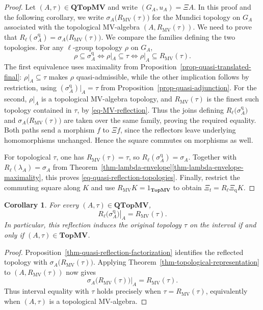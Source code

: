 \documentclass[preprint,3p]{elsarticle}
\theoremstyle{plain}
\newtheorem{cor}[thm]{Corollary}
\theoremstyle{definition}
\newcommand{\TopMV}{\mathbf{TopMV}}
\newcommand{\QTopMV}{\mathbf{QTopMV}}
\numberwithin{equation}{section}
\begin{document}
\begin{proof}
Let $(A,\tau)\in\QTopMV$ and write $(G_A,u_A)=\Xi A$.
In this proof and the following corollary, we write
$\sigma_A\bigl(R_{\mathrm{MV}}(\tau)\bigr)$ for the Mundici topology
on $G_A$ associated with the topological MV-algebra
$(A,R_{\mathrm{MV}}(\tau))$.
We need to prove that
$R_\ell(\sigma_A^{\mathrm q})=\sigma_A\bigl(R_{\mathrm{MV}}(\tau)\bigr)$.
We compare the families defining the two topologies.
For any $\ell$-group topology $\rho$ on $G_A$,
\[
 \rho\subseteq\sigma_A^{\mathrm q}
 \iff \rho|_A\subseteq\tau
 \iff \rho|_A\subseteq R_{\mathrm{MV}}(\tau).
\]
The first equivalence uses maximality from
Proposition~\ref{prop-quasi-translated-final}:
$\rho|_A\subseteq\tau$ makes $\rho$ quasi-admissible, while the
other implication follows by restriction, using
$(\sigma_A^{\mathrm q})|_A=\tau$ from
Proposition~\ref{prop-quasi-adjunction}.
For the second, $\rho|_A$ is a topological MV-algebra topology,
and $R_{\mathrm{MV}}(\tau)$ is the finest such topology contained
in $\tau$, by \eqref{eq-MV-reflection}.
Thus the joins defining $R_\ell\bigl(\sigma_A^{\mathrm q}\bigr)$ and
$\sigma_A\bigl(R_{\mathrm{MV}}(\tau)\bigr)$ are taken over the same family,
proving the required equality.
Both paths send a morphism $f$ to $\Xi f$, since the reflectors
leave underlying homomorphisms unchanged.
Hence the square commutes on morphisms as well.

For topological $\tau$, one has $R_{\mathrm{MV}}(\tau)=\tau$, so
$R_\ell(\sigma_A^{\mathrm q})=\sigma_A$.
Together with $R_\ell(\lambda_A)=\sigma_A$ from
Theorem~\ref{thm-lambda-envelope}\ref{thm-lambda-envelope-maximality}, this proves
\eqref{eq-quasi-reflection-topologies}.
Finally, restrict the commuting square along $K$ and use
$R_{\mathrm{MV}}K=1_{\TopMV}$ to obtain
$\Xi_t=R_\ell\Xi_{\mathrm q}K$.
\end{proof}

\begin{cor}
\label{cor-quasi-reflection-exactness}
For every $(A,\tau)\in\QTopMV$,
\[
 \left.R_\ell\bigl(\sigma_A^{\mathrm q}\bigr)\right|_A
 =R_{\mathrm{MV}}(\tau).
\]
In particular, this reflection induces the original topology $\tau$
on the interval if and only if $(A,\tau)\in\TopMV$.
\end{cor}

\begin{proof}
Proposition~\ref{thm-quasi-reflection-factorization} identifies the
reflected topology with $\sigma_A\bigl(R_{\mathrm{MV}}(\tau)\bigr)$.
Applying Theorem~\ref{thm-topological-representation} to
$(A,R_{\mathrm{MV}}(\tau))$ now gives
\[
 \left.\sigma_A\bigl(R_{\mathrm{MV}}(\tau)\bigr)\right|_A
 =R_{\mathrm{MV}}(\tau).
\]
Thus interval equality with $\tau$ holds
precisely when $\tau=R_{\mathrm{MV}}(\tau)$, equivalently when
$(A,\tau)$ is a topological MV-algebra.
\end{proof}
\end{document}
